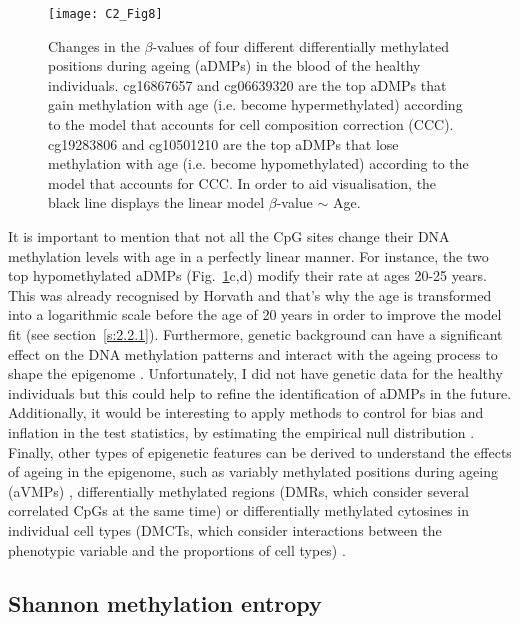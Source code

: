 \begin{figure}[htbp!] 
	\centering    
	\texttt{[image: C2\_Fig8]}
	\caption[Changes in the $\beta$-values of four different aDMPs]{Changes in the $\beta$-values of four different differentially methylated positions during ageing (aDMPs) in the blood of the healthy individuals. cg16867657 and cg06639320 are the top aDMPs that gain methylation with age (i.e. become hypermethylated) according to the model that accounts for cell composition correction (CCC). cg19283806 and cg10501210 are the top aDMPs that lose methylation with age (i.e. become hypomethylated) according to the model that accounts for CCC. In order to aid visualisation, the black line displays the linear model $\beta$-value $\sim$ Age.}
	\label{fig:c2_fig8}
\end{figure}

\bigskip

It is important to mention that not all the CpG sites change their DNA methylation levels with age in a perfectly linear manner. For instance, the two top hypomethylated aDMPs (Fig.~\ref{fig:c2_fig8}c,d) modify their rate at ages 20-25 years. This was already recognised by Horvath \cite{Horvath2013} and that's why the age is transformed into a logarithmic scale before the age of 20 years in order to improve the model fit (see section~\ref{s:2.2.1}). Furthermore, genetic background can have a significant effect on the DNA methylation patterns and interact with the ageing process to shape the epigenome \cite{VanDongen2016,Hannum2013}. Unfortunately, I did not have genetic data for the healthy individuals but this could help to refine the identification of aDMPs in the future. Additionally, it would be interesting to apply methods to control for bias and inflation in the test statistics, by estimating the empirical null distribution \cite{VanIterson2017}. Finally, other types of epigenetic features can be derived to understand the effects of ageing in the epigenome, such as variably methylated positions during ageing (\acrshort{aVMPs}) \cite{Slieker2016}, differentially methylated regions (\acrshort{DMRs}, which consider several correlated CpGs at the same time) \cite{Teschendorff2018} or differentially methylated cytosines in individual cell types (\acrshort{DMCTs}, which consider interactions between the phenotypic variable and the proportions of cell types) \cite{Zheng2018}.


\smallskip

\subsection{Shannon methylation entropy}

